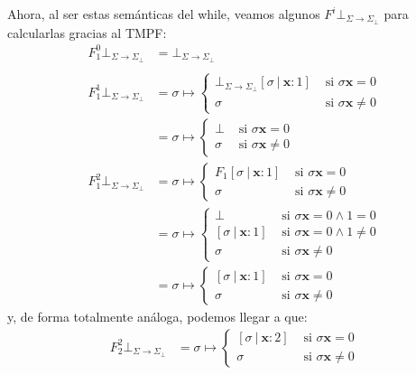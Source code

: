 \documentclass{article}
\newcommand{\x}{\textbf{x}}
\newcommand{\cdom}{\Sigma \to \Sigma_\bot}
\newcommand{\cfbot}{\bot_{\cdom}}
\begin{document}
Ahora, al ser estas semánticas del while, veamos algunos $F^i \cfbot$ para calcularlas gracias al TMPF:
\begin{equation*}
  \begin{aligned}
    F_1^0 \cfbot &= \cfbot \\ 
    \\ 
    F_1^1 \cfbot &= \sigma \mapsto \begin{cases}
      \cfbot [\sigma\ |\ \x : 1] &\text{ si }\sigma\x = 0 \\ 
      \sigma &\text{ si }\sigma\x \neq 0
    \end{cases} \\ 
                 &= \sigma \mapsto \begin{cases}
                   \bot &\text{ si }\sigma\x = 0 \\ 
                   \sigma &\text{ si }\sigma\x \neq 0
                 \end{cases}
    \\ 
      F_1^2 \cfbot &= \sigma \mapsto \begin{cases}
        F_1 [\sigma\ |\ \x : 1] &\text{ si }\sigma\x = 0 \\ 
        \sigma &\text{ si }\sigma\x \neq 0 
      \end{cases} \\ 
                   &= \sigma \mapsto \begin{cases}
                     \bot &\text{ si }\sigma\x = 0 \land 1 = 0 \\ 
                     [\sigma\ |\ \x : 1] &\text{ si }\sigma\x = 0 \land 1 \neq 0 \\ 
                     \sigma &\text{ si }\sigma\x \neq 0
                   \end{cases} \\ 
                   &= \sigma \mapsto \begin{cases}
                     [\sigma\ |\ \x : 1] &\text{ si } \sigma\x = 0 \\ 
                     \sigma &\text{ si }\sigma\x \neq 0
                   \end{cases}
  \end{aligned}
\end{equation*}
y, de forma totalmente análoga, podemos llegar a que:
\begin{equation*}
  \begin{aligned}
    F_2^2 \cfbot &= \sigma \mapsto \begin{cases}
      [\sigma\ |\ \x : 2] &\text{ si }\sigma\x = 0 \\ 
      \sigma &\text{ si }\sigma\x \neq 0
    \end{cases}
  \end{aligned}
\end{equation*}
\end{document}
